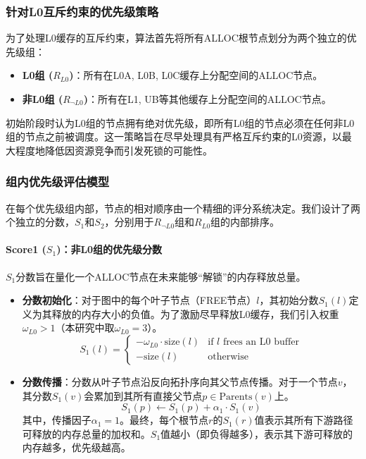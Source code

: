 \documentclass[11pt,a4paper]{article}
\begin{document}
\subsubsection{针对L0互斥约束的优先级策略}
为了处理L0缓存的互斥约束，算法首先将所有ALLOC根节点划分为两个独立的优先级组：
\begin{itemize}
    \item \textbf{L0组 ($R_{L0}$)}：所有在L0A, L0B, L0C缓存上分配空间的ALLOC节点。
    \item \textbf{非L0组 ($R_{\neg L0}$)}：所有在L1, UB等其他缓存上分配空间的ALLOC节点。
\end{itemize}
初始阶段时认为L0组的节点拥有绝对优先级，即所有L0组的节点必须在任何非L0组的节点之前被调度。这一策略旨在尽早处理具有严格互斥约束的L0资源，以最大程度地降低因资源竞争而引发死锁的可能性。

\subsubsection{组内优先级评估模型}
在每个优先级组内部，节点的相对顺序由一个精细的评分系统决定。我们设计了两个独立的分数，$S_1$和$S_2$，分别用于$R_{\neg L0}$组和$R_{L0}$组的内部排序。

\paragraph{Score1 ($S_1$)：非L0组的优先级分数}
$S_1$分数旨在量化一个ALLOC节点在未来能够“解锁”的内存释放总量。
\begin{itemize}
    \item \textbf{分数初始化}：对于图中的每个叶子节点（FREE节点）$l$，其初始分数$S_1(l)$定义为其释放的内存大小的负值。为了激励尽早释放L0缓存，我们引入权重$\omega_{L0} > 1$（本研究中取$\omega_{L0}=3$）。
    \[
    S_1(l) = \begin{cases} 
    -\omega_{L0} \cdot \text{size}(l) & \text{if } l \text{ frees an L0 buffer} \\
    -\text{size}(l) & \text{otherwise}
    \end{cases}
    \]
    \item \textbf{分数传播}：分数从叶子节点沿反向拓扑序向其父节点传播。对于一个节点$v$，其分数$S_1(v)$会累加到其所有直接父节点$p \in \text{Parents}(v)$上。
    \[
    S_1(p) \leftarrow S_1(p) + \alpha_1 \cdot S_1(v)
    \]
    其中，传播因子$\alpha_1=1$。最终，每个根节点$r$的$S_1(r)$值表示其所有下游路径可释放的内存总量的加权和。$S_1$值越小（即负得越多），表示其下游可释放的内存越多，优先级越高。
\end{itemize}
\end{document}
